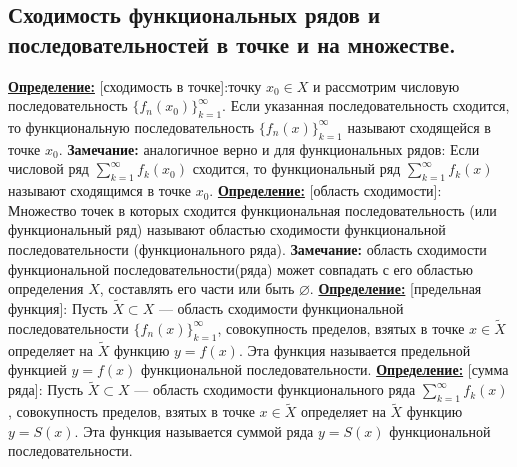 \documentclass[a4paper,12pt]{article} %
\begin{document}
\subsection{Сходимость функциональных рядов и последовательностей в точке и на множестве.}
\underline{\textbf{Определение:}} [сходимость в точке]: точку $x_0 \in X$ и рассмотрим числовую последовательность $\{f_n(x_0)\}_{k=1}^\infty$. Если указанная последовательность сходится, то функциональную последовательность $\{f_n(x)\}_{k=1}^\infty$ называют сходящейся в точке $x_0$. \newline \newline
\textbf{Замечание:} аналогичное верно и для функциональных рядов: Если числовой ряд $\sum\limits_{k = 1}^{\infty}  f_k(x_0)$ сходится, то функциональный ряд  $\sum\limits_{k = 1}^{\infty}  f_k(x)$ называют сходящимся в точке $x_0$. \newline
\underline{\textbf{Определение:}} [область сходимости]:\newline
Множество точек в которых сходится функциональная последовательность (или функциональный ряд) называют областью сходимости функциональной последовательности (функционального ряда). \newline 
\textbf{Замечание:} область сходимости функциональной последовательности(ряда) может совпадать с его областью определения $X$, составлять его части или быть $\varnothing$. \newline
\underline{\textbf{Определение:}} [предельная функция]:\newline
Пусть $\widetilde{X} \subset X$ ---  область сходимости функциональной последовательности $\{f_n(x)\}_{k=1}^\infty$, совокупность пределов, взятых в точке $x\in \widetilde{X}$ определяет на $\widetilde{X}$ функцию $y = f(x)$. Эта функция называется предельной функцией $y = f(x) $ функциональной последовательности. \newline
\noindent \underline{\textbf{Определение:}} [сумма ряда]:\newline
Пусть $\widetilde{X} \subset X$ ---  область сходимости функционального ряда  $\sum\limits_{k = 1}^{\infty}  f_k(x)$, совокупность пределов, взятых в точке $x\in \widetilde{X}$ определяет на $\widetilde{X}$ функцию $y = S(x)$. Эта функция называется суммой ряда  $y = S(x) $ функциональной последовательности.\\
\end{document}
